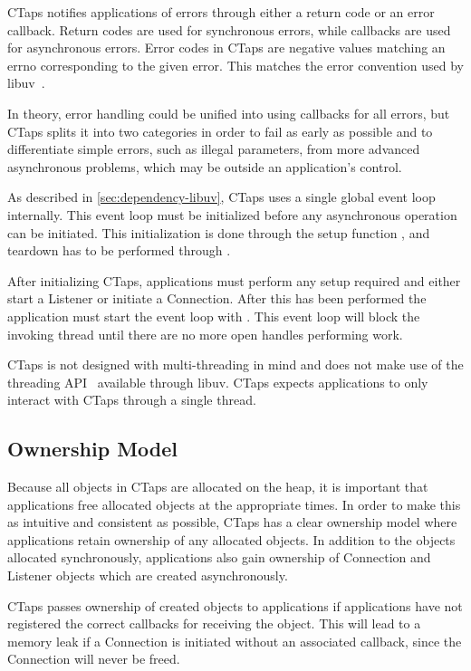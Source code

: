 CTaps notifies applications of errors
through either a return code or an error callback.
Return codes are used for synchronous errors, while callbacks
are used for asynchronous errors.
Error codes in CTaps are
negative values matching
an errno corresponding to the given error. This matches the
error convention used by libuv~\cite{libuv_errors}.

In theory, error handling could be unified into using callbacks
for all errors, but CTaps splits it into two categories in order
to fail as early as possible and to differentiate simple errors,
such as illegal parameters, from more advanced asynchronous problems,
which may be outside an application's control.

As described in \cref{sec:dependency-libuv}, CTaps
uses a single global event loop internally.
This event loop must be initialized before any asynchronous operation can be initiated.
This initialization is done through the setup function , and teardown has to
be performed through .

After initializing CTaps, applications must perform any setup
required and either start a Listener or initiate a Connection.
After this has been performed the
application must start the event loop with .
This event loop will block the invoking thread until there are 
no more open handles performing work.

CTaps is not designed with multi-threading in mind and does not make use
of the threading API~\cite{libuv_threading} available through libuv. CTaps expects applications
to only interact with CTaps through a single thread.

\subsection{Ownership Model}
Because all objects in CTaps are allocated on the heap,
it is important that applications free allocated objects at the appropriate times.
In order to make this as intuitive and consistent as possible, CTaps has a clear ownership model
where applications retain ownership of any allocated objects.
In addition to the objects allocated synchronously, applications
also gain ownership of Connection and Listener objects which are created asynchronously.

CTaps passes ownership of created objects to applications if
applications have not registered the
correct callbacks for receiving the object.
This will lead to a memory leak if a Connection is initiated without
an associated  callback, since the Connection will never be freed.

